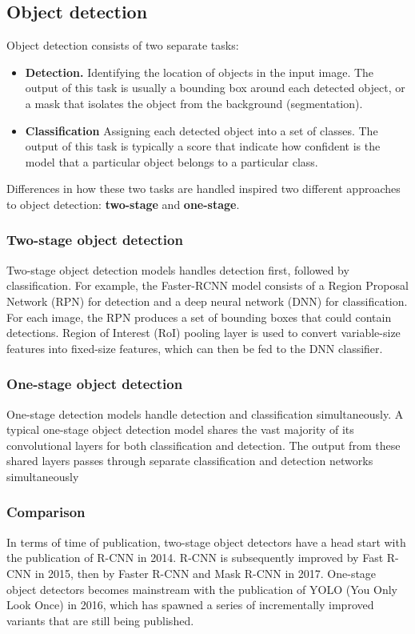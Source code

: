 \documentclass[12pt,a4paper,twoside,openright]{report}
\begin{document}
\subsection{Object detection}
Object detection consists of two separate tasks:
\begin{itemize}
    \item \textbf{Detection.} Identifying the location of objects in the input image. The output of this task is usually a bounding box around each detected object, or a mask that isolates the object from the background (segmentation).
    \item \textbf{Classification} Assigning each detected object into a set of classes. The output of this task is typically a score that indicate how confident is the model that a particular object belongs to a particular class.
\end{itemize}

Differences in how these two tasks are handled inspired two different approaches to object detection: \textbf{two-stage} and \textbf{one-stage}.

\subsubsection{Two-stage object detection}
Two-stage object detection models handles detection first, followed by classification. For example, the Faster-RCNN model consists of a Region Proposal Network (RPN) for detection and a deep neural network (DNN) for classification. For each image, the RPN produces a set of bounding boxes that could contain detections. Region of Interest (RoI) pooling layer is used to convert variable-size features into fixed-size features, which can then be fed to the DNN classifier.

\subsubsection{One-stage object detection}
One-stage detection models handle detection and classification simultaneously. A typical one-stage object detection model shares the vast majority of its convolutional layers for both classification and detection. The output from these shared layers passes through separate classification and detection networks simultaneously

\subsubsection{Comparison}
In terms of time of publication, two-stage object detectors have a head start with the publication of R-CNN \cite{girshick_rich_2014} in 2014. R-CNN is subsequently improved by Fast R-CNN \cite{girshick_fast_2015} in 2015, then by Faster R-CNN \cite{ren_faster_2016} and Mask R-CNN in 2017. One-stage object detectors becomes mainstream with the publication of YOLO (You Only Look Once) \cite{redmon_you_2016} in 2016, which has spawned a series of incrementally improved variants that are still being published.
\end{document}
